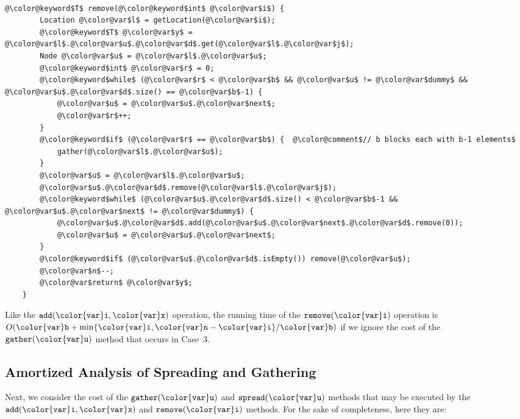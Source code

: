 \documentclass[10pt]{book}
\theoremstyle{plain}
\theoremstyle{definition}
\begin{document}
 \ \vspace{.5ex}\begin{Verbatim}[gobble=1,tabsize=2,frame=single,framerule=1.2pt,commandchars=\\@\$,label=\texttt{SEList},labelposition=topline]
	@\color@keyword$T$ remove(@\color@keyword$int$ @\color@var$i$) {
		Location @\color@var$l$ = getLocation(@\color@var$i$);
		@\color@keyword$T$ @\color@var$y$ = @\color@var$l$.@\color@var$u$.@\color@var$d$.get(@\color@var$l$.@\color@var$j$);
		Node @\color@var$u$ = @\color@var$l$.@\color@var$u$;
		@\color@keyword$int$ @\color@var$r$ = 0;
		@\color@keyword$while$ (@\color@var$r$ < @\color@var$b$ && @\color@var$u$ != @\color@var$dummy$ && @\color@var$u$.@\color@var$d$.size() == @\color@var$b$-1) {
			@\color@var$u$ = @\color@var$u$.@\color@var$next$;
			@\color@var$r$++;
		}
		@\color@keyword$if$ (@\color@var$r$ == @\color@var$b$) {  @\color@comment$// b blocks each with b-1 elements$
			gather(@\color@var$l$.@\color@var$u$);
		}
		@\color@var$u$ = @\color@var$l$.@\color@var$u$;
		@\color@var$u$.@\color@var$d$.remove(@\color@var$l$.@\color@var$j$);
		@\color@keyword$while$ (@\color@var$u$.@\color@var$d$.size() < @\color@var$b$-1 && @\color@var$u$.@\color@var$next$ != @\color@var$dummy$) {
			@\color@var$u$.@\color@var$d$.add(@\color@var$u$.@\color@var$next$.@\color@var$d$.remove(0));
			@\color@var$u$ = @\color@var$u$.@\color@var$next$;
		}
		@\color@keyword$if$ (@\color@var$u$.@\color@var$d$.isEmpty()) remove(@\color@var$u$);
		@\color@var$n$--;
		@\color@var$return$ @\color@var$y$;
	}
\end{Verbatim}


Like the \ensuremath{\mathtt{add({\color{var}i},{\color{var}x})}} operation, the running time of the \ensuremath{\mathtt{remove({\color{var}i})}}
operation is $O(\ensuremath{\mathtt{{\color{var}b}}}+\min\{\ensuremath{\mathtt{{\color{var}i}}},\ensuremath{\mathtt{{\color{var}n}}}-\ensuremath{\mathtt{{\color{var}i}}}\}/\ensuremath{\mathtt{{\color{var}b}}})$ if we ignore the cost of
the \ensuremath{\mathtt{gather({\color{var}u})}} method that occurs in Case~3.

\subsection{Amortized Analysis of Spreading and Gathering}

Next, we consider the cost of the \ensuremath{\mathtt{gather({\color{var}u})}} and \ensuremath{\mathtt{spread({\color{var}u})}} methods
that may be executed by the \ensuremath{\mathtt{add({\color{var}i},{\color{var}x})}} and \ensuremath{\mathtt{remove({\color{var}i})}} methods.  For the
sake of completeness, here they are:
\end{document}
